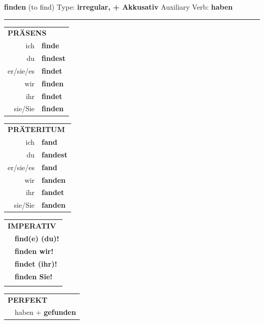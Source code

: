 \documentclass[10pt,a4paper]{revtex4-2}
\begin{document}
\begin{verbbox-acc}
    {\Large \bf finden} (to find) \hfill Type: \textbf{irregular, + Akkusativ} \hfill Auxiliary Verb: \textbf{haben} 
    
     \vspace{5pt}

    \hrule
    
    \vspace{5pt}

  \begin{tabular}{rl}
     \multicolumn{2}{l}{\textbf{PRÄSENS} }\\
    ich & \textbf{finde}\\
    du & \textbf{findest}\\
    er/sie/es & \textbf{findet}\\
    wir & \textbf{finden}\\
    ihr & \textbf{findet}\\
    sie/Sie & \textbf{finden}\\
  \end{tabular}
  \hfill
     \begin{tabular}{rl}
    \multicolumn{2}{l}{\textbf{PRÄTERITUM} }\\
    ich & \textbf{fand}\\
    du & \textbf{fandest}\\
    er/sie/es & \textbf{fand}\\
    wir & \textbf{fanden}\\
    ihr & \textbf{fandet}\\
    sie/Sie & \textbf{fanden}\\
  \end{tabular}
  \hfill
  \begin{tabular}{rl}
     \multicolumn{2}{l}{\textbf{IMPERATIV} }\\
   & \textbf{find(e) (du)!}\\
   & \textbf{finden wir!}\\
   & \textbf{findet (ihr)!}\\
   & \textbf{finden Sie!}\\
   & \vspace{10pt}
  \end{tabular}

    \vspace{10pt}

 \begin{tabular}{rl}
     \multicolumn{2}{l}{\textbf{PERFEKT}}\\
  &  haben + \textbf{gefunden}\\
  \end{tabular}
\hfill
   \begin{tabular}{rl}
   

\end{tabular}
\end{verbbox-acc}
\end{document}
